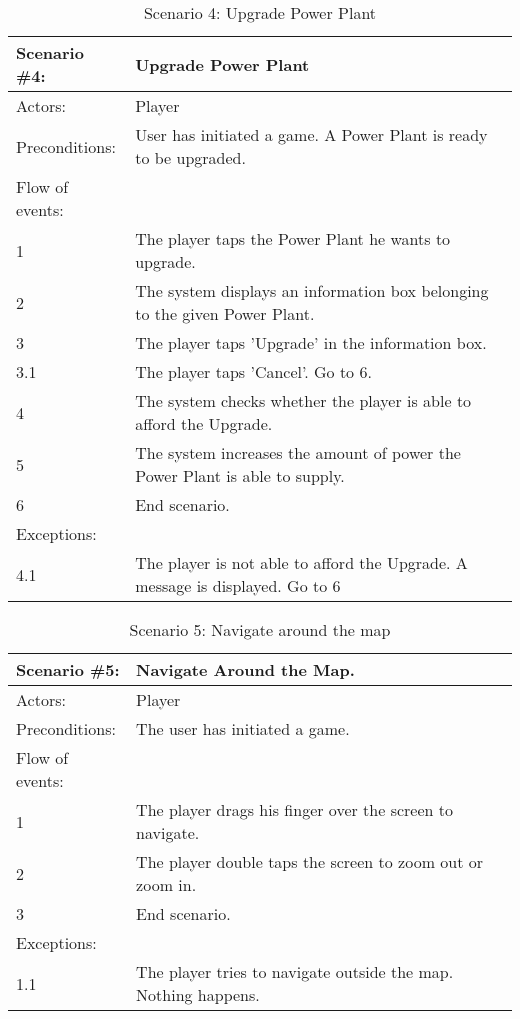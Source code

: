 \begin{table}
	\begin{tabular}{| l | p{10cm} |}
		\hline
		\rowcolor{lightgray}
		{\bf Scenario \#4:} & {\bf Upgrade Power Plant} \\ \hline
		Actors: & Player \\ \hline
		Preconditions: & User has initiated a game. A Power Plant is ready to be upgraded. \\ \hline
		\rowcolor{lightergray}
		Flow of events: & \\ \hline
		1 & The player taps the Power Plant he wants to upgrade. \\ \hline
		2 & The system displays an information box belonging to the given Power Plant. \\ \hline
		3 & The player taps 'Upgrade' in the information box. \\ \hline
		3.1 & The player taps 'Cancel'. Go to 6. \\ \hline
		4 & The system checks whether the player is able to afford the Upgrade. \\ \hline
		5 & The system increases the amount of power the Power Plant is able to supply. \\ \hline
		6 & End scenario. \\ \hline
		\rowcolor{lightergray}
		Exceptions: & \\ \hline
		4.1 & The player is not able to afford the Upgrade. A message is displayed. Go to 6 \\ \hline 
	\end{tabular}
\caption{Scenario 4: Upgrade Power Plant}
\end{table}

\begin{table}
	\begin{tabular}{| l | p{10cm} |}
		\hline
		\rowcolor{lightgray}
		{\bf Scenario \#5:} & {\bf Navigate Around the Map.} \\ \hline
		Actors: & Player \\ \hline
		Preconditions: & The user has initiated a game. \\ \hline
		\rowcolor{lightergray}
		Flow of events: & \\ \hline
		1 & The player drags his finger over the screen to navigate. \\ \hline
		2 & The player double taps the screen to zoom out or zoom in. \\ \hline
		3 & End scenario. \\ \hline
		\rowcolor{lightergray}
		Exceptions: & \\ \hline
		1.1 & The player tries to navigate outside the map. Nothing happens. \\ \hline
	\end{tabular}
	\caption{Scenario 5: Navigate around the map}
\end{table}

